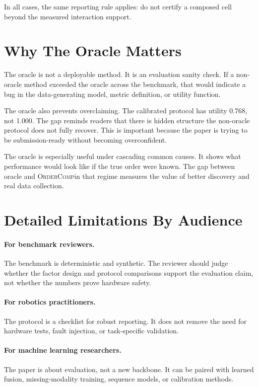 \documentclass{article}
\newcommand{\method}{\textsc{OrderComp}}
\begin{document}
In all cases, the same reporting rule applies: do not certify a composed cell beyond the measured interaction support.

\section{Why The Oracle Matters}

The oracle is not a deployable method. It is an evaluation sanity check. If a non-oracle method exceeded the oracle across the benchmark, that would indicate a bug in the data-generating model, metric definition, or utility function.

The oracle also prevents overclaiming. The calibrated protocol has utility 0.768, not 1.000. The gap reminds readers that there is hidden structure the non-oracle protocol does not fully recover. This is important because the paper is trying to be submission-ready without becoming overconfident.

The oracle is especially useful under cascading common causes. It shows what performance would look like if the true order were known. The gap between oracle and \method in that regime measures the value of better discovery and real data collection.

\section{Detailed Limitations By Audience}

\paragraph{For benchmark reviewers.}
The benchmark is deterministic and synthetic. The reviewer should judge whether the factor design and protocol comparisons support the evaluation claim, not whether the numbers prove hardware safety.

\paragraph{For robotics practitioners.}
The protocol is a checklist for robust reporting. It does not remove the need for hardware tests, fault injection, or task-specific validation.

\paragraph{For machine learning researchers.}
The paper is about evaluation, not a new backbone. It can be paired with learned fusion, missing-modality training, sequence models, or calibration methods.
\end{document}
